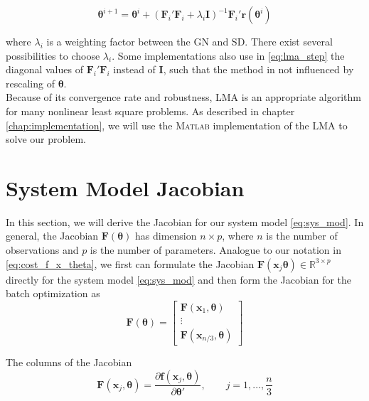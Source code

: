 \begin{equation}
\label{eq:lma_step}
\boldsymbol{\theta}^{i+1} =
\boldsymbol{\theta}^{i} + 
(\mathbf{F}_i' \mathbf{F}_i + \lambda_i \mathbf{I})^{-1} \mathbf{F}_i' \mathbf{r}(\boldsymbol{\theta}^{i})
\end{equation}

where $\lambda_i$ is a weighting factor between the GN and SD.
There exist several possibilities to choose $\lambda_i$.
Some implementations also use in \eqref{eq:lma_step} the diagonal values of $\mathbf{F}_i' \mathbf{F}_i$ instead of $\mathbf{I}$, such that the method in not influenced by rescaling of $\boldsymbol{\theta}$.
\\

Because of its convergence rate and robustness, LMA is an appropriate algorithm for many nonlinear least square problems.
As described in chapter \ref{chap:implementation}, we will use the \textsc{Matlab} implementation of the LMA to solve our problem.


\section{System Model Jacobian}
In this section, we will derive the Jacobian for our system model \eqref{eq:sys_mod}.
In general, the Jacobian $\mathbf{F}(\boldsymbol{\theta})$ has dimension $n \times p$, where $n$ is the number of observations and $p$ is the number of parameters.
Analogue to our notation in \eqref{eq:cost_f_x_theta}, we first can formulate the Jacobian $\mathbf{F}(\mathbf{x}_j\boldsymbol{\theta}) \in \mathbb{R}^{3\times p}$ directly for the system model \eqref{eq:sys_mod} and then form the Jacobian for the batch optimization as
\begin{equation}
\mathbf{F}(\boldsymbol{\theta}) = \left[ \begin{array}{c}
\mathbf{F}(\mathbf{x}_1, \boldsymbol{\theta}) \\
\vdots \\
\mathbf{F}(\mathbf{x}_{n/3}, \boldsymbol{\theta})
\end{array} \right]
\end{equation}

The columns of the Jacobian
\begin{equation}
\mathbf{F}(\mathbf{x}_j, \boldsymbol{\theta}) = 
\frac{\partial \mathbf{f}(\mathbf{x}_j, \boldsymbol{\theta})} {\partial \boldsymbol{\theta}'}
, \qquad j=1,...,\frac{n}{3}
\end{equation}

